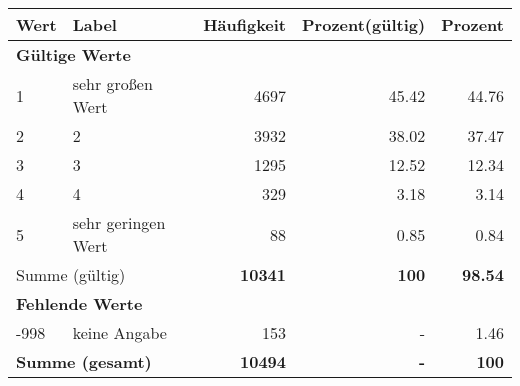      \begin{longtable}{lXrrr}
     \toprule
     \textbf{Wert} & \textbf{Label} & \textbf{Häufigkeit} & \textbf{Prozent(gültig)} & \textbf{Prozent} \\
     \endhead
     \midrule
     \multicolumn{5}{l}{\textbf{Gültige Werte}}\\

     1 &
     \multicolumn{1}{X}{ sehr großen Wert   } &


       \num{4697} &
       \num[round-mode=places,round-precision=2]{45.42} &
         \num[round-mode=places,round-precision=2]{44.76} \\

     2 &
     \multicolumn{1}{X}{ 2   } &


       \num{3932} &
       \num[round-mode=places,round-precision=2]{38.02} &
         \num[round-mode=places,round-precision=2]{37.47} \\

     3 &
     \multicolumn{1}{X}{ 3   } &


       \num{1295} &
       \num[round-mode=places,round-precision=2]{12.52} &
         \num[round-mode=places,round-precision=2]{12.34} \\

     4 &
     \multicolumn{1}{X}{ 4   } &


       \num{329} &
       \num[round-mode=places,round-precision=2]{3.18} &
         \num[round-mode=places,round-precision=2]{3.14} \\

     5 &
     \multicolumn{1}{X}{ sehr geringen Wert   } &


       \num{88} &
       \num[round-mode=places,round-precision=2]{0.85} &
         \num[round-mode=places,round-precision=2]{0.84} \\
     \midrule
     \multicolumn{2}{l}{Summe (gültig)} &
       \textbf{\num{10341}} &
     \textbf{\num{100}} &
       \textbf{\num[round-mode=places,round-precision=2]{98.54}} \\
     \multicolumn{5}{l}{\textbf{Fehlende Werte}}\\
       -998 &
       keine Angabe &
         \num{153} &
        - &
         \num[round-mode=places,round-precision=2]{1.46} \\
     \midrule
     \multicolumn{2}{l}{\textbf{Summe (gesamt)}} &
          \textbf{\num{10494}} &
        \textbf{-} &
        \textbf{\num{100}} \\
     \bottomrule
     \end{longtable}
     
